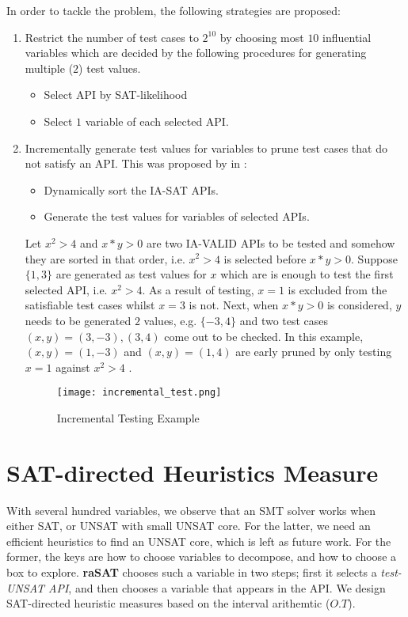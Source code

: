 In order to tackle the problem, the following strategies are proposed:
\begin{enumerate}
\item Restrict the number of test cases to $2^{10}$ by choosing most $10$ influential variables which are decided by the following procedures for generating multiple ($2$) test values.
\begin{itemize}
\item Select API by SAT-likelihood
\item Select $1$ variable of each selected API.
\end{itemize}
\item Incrementally generate test values for variables to prune test cases that do not satisfy an API. This was proposed by \citeauthor{khanhReport} in \cite{khanhReport}:
\begin{itemize}
\item Dynamically sort the IA-SAT APIs.
\item Generate the test values for variables of selected APIs.
\end{itemize}
\begin{example}
Let $x^2 > 4$ and $x*y > 0$ are two IA-VALID APIs to be tested and somehow they are sorted in that order, i.e. $x^2 > 4$ is selected before $x*y > 0$. Suppose $\{1, 3\}$ are generated as test values for $x$ which are is enough to test the first selected API, i.e. $x^2 > 4$. As a result of testing, $x = 1$ is excluded from the satisfiable test cases whilst $x = 3$ is not. Next, when $x*y > 0$ is considered, $y$ needs to be generated $2$ values, e.g. $\{-3, 4\}$ and two test cases $(x, y) = (3, -3), (3, 4)$ come out to be checked. In this example, $(x, y) = (1, -3)$ and  $(x, y) = (1, 4)$ are early pruned by only testing $x = 1$ against $x^2 > 4$ .
\end{example}
\begin{figure}[ht]
\centering
\texttt{[image: incremental\_test.png]} 
\caption{Incremental Testing Example} 
\label{fig:incremental-test} 
\end{figure} 
\end{enumerate}

\section{SAT-directed Heuristics Measure} \label{sec:SATheuristics}

With several hundred variables, we observe that an SMT solver works 
when either SAT, or UNSAT with small UNSAT core.
%
For the latter, we need an efficient heuristics to find an UNSAT core, which is left as future work. 
For the former, the keys are how to choose variables to decompose, and 
how to choose a box to explore. 
{\bf raSAT} chooses such a variable in two steps; first it selects a {\em test-UNSAT API}, and
then chooses a variable that appears in the API. 
We design SAT-directed heuristic measures based on the interval arithemtic ($O.T$). 

